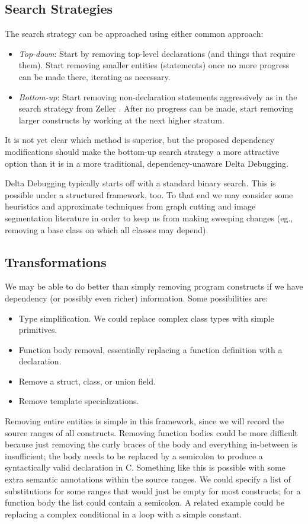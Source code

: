 \documentclass[11pt]{article}
\begin{document}
\subsection{Search Strategies}
The search strategy can be approached using either common approach:
\begin{itemize}
\item \emph{Top-down}: Start by removing top-level declarations (and things that
  require them). Start removing smaller entities (statements) once no more
  progress can be made there, iterating as necessary.
\item \emph{Bottom-up}: Start removing non-declaration statements aggressively
  as in the search strategy from Zeller \citet{dd}. After no progress can be
  made, start removing larger constructs by working at the next higher stratum.
\end{itemize}
It is not yet clear which method is superior, but the proposed dependency
modifications should make the bottom-up search strategy a more attractive option
than it is in a more traditional, dependency-unaware Delta Debugging.

Delta Debugging typically starts off with a standard binary search. This is
possible under a structured framework, too. To that end we may consider some
heuristics and approximate techniques from graph cutting and image segmentation
literature \citep{nc} in order to keep us from making sweeping changes (eg.,
removing a base class on which all classes may depend).

\subsection{Transformations}
We may be able to do better than simply removing program constructs if we have
dependency (or possibly even richer) information.  Some possibilities are:
\begin{itemize}
\item Type simplification.  We could replace complex class types with simple
  primitives.
\item Function body removal, essentially replacing a function definition with a
  declaration.
\item Remove a struct, class, or union field.
\item Remove template specializations.
\end{itemize}

Removing entire entities is simple in this framework, since we will record the
source ranges of all constructs.  Removing function bodies could be more
difficult because just removing the curly braces of the body and everything
in-between is insufficient; the body needs to be replaced by a semicolon to
produce a syntactically valid declaration in C.  Something like this is possible
with some extra semantic annotations within the source ranges. We could specify
a list of substitutions for some ranges that would just be empty for most
constructs; for a function body the list could contain a semicolon.  A related
example could be replacing a complex conditional in a loop with a simple
constant.
\end{document}
